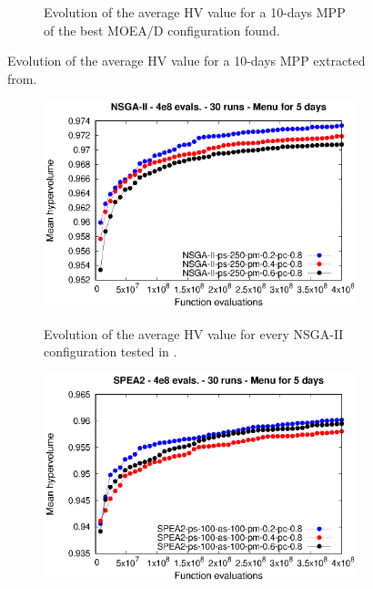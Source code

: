 \begin{figure}[H]
\begin{subfigure}{.9\textwidth}
  \caption{Evolution of the average HV value for a 10-days MPP of the best MOEA/D configuration found.}
\end{subfigure}
\caption{Evolution of the average HV value for a 10-days MPP extracted from\cite{Miranda2018}.}
\label{fig:previous_HV_10}
\end{figure}


\begin{figure}[H]
\begin{subfigure}{.5\textwidth}
  \centering
  \includegraphics[width=1.0\linewidth]{../references/meanHV_Evolution_NSGA2_days_5.eps}
  \label{fig:sfig1}
    \caption{Evolution of the average HV value for every NSGA-II configuration tested in \cite{Miranda2018}.}
\end{subfigure}%
\begin{subfigure}{.5\textwidth}
  \centering
  \includegraphics[width=1.0\linewidth]{../references/meanHV_Evolution_SPEA2_days_5.eps}

\end{subfigure}
\end{figure}
